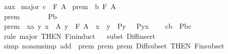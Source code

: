 \begin{isabellebody}
\isamarkupfalse%
%
\endisatagproof
{\isafoldproof}%
%
\isadelimproof
\isanewline
%
\endisadelimproof
\isanewline
{}\isamarkupfalse%
\ aux{\isacharcolon}\isanewline
{}\ major{\isacharcolon}\ {\isachardoublequoteopen}c\ {\isacharcolon}\ {\isacharpercent}F\ A{\isachardoublequoteclose}\isanewline
{}\ prem{}{\isacharcolon}\ \ {\isachardoublequoteopen}b{\isacharcolon}\ {\isacharpercent}F\ A{\isachardoublequoteclose}\ \ \ \ \ \ \ \ \ \ \ \ \ \ \ \ \ \ \ \ \ \ \ \ \ \ \ \ \ \ \ \ \ \ \ \isanewline
{}\ prem{}{\isacharcolon}\ {\isachardoublequoteopen}\ \ \ \ \ \ \ P{\isacharparenleft}b{\isacharparenright}{\isachardoublequoteclose}\ \ \ \ \ \ \ \ \ \ \ \ \ \ \ \ \ \ \ \ \ \ \ \ \ \ \ \ \ \ \ \ \ \ \ \ \ \ \ \ \ \ \ \ \isanewline
{}\ prem{}{\isacharcolon}\ {\isachardoublequoteopen}\ {\isacharbang}{\isacharbang}{\isacharparenleft}x{\isacharcolon}{\isacharcolon}{\isacharprime}a{\isacharparenright}\ y{\isachardot}\ {\isasymlbrakk}x\ {\isacharcolon}\ A{\isacharsemicolon}\ y\ {\isacharcolon}\ {\isacharpercent}F\ A{\isacharsemicolon}\ \ x\ {\isacharcolon}\ y{\isacharsemicolon}\ \ P{\isacharparenleft}y{\isacharparenright}\ {\isasymrbrakk}\ {\isasymLongrightarrow}\ P{\isacharparenleft}y{\isacharminus}{\isacharbraceleft}x{\isacharbraceright}{\isacharparenright}\ {\isachardoublequoteclose}\ \isanewline
{}\ {\isachardoublequoteopen}\ c{\isacharless}{\isacharequal}b\ {\isasymlongrightarrow}\ P{\isacharparenleft}b{\isacharminus}c{\isacharparenright}{\isachardoublequoteclose}\isanewline
%
\isadelimproof
%
\endisadelimproof
%
\isatagproof
{}\isamarkupfalse%
\ {\isacharparenleft}rule\ major\ {\isacharbrackleft}THEN\ Fin{\isacharunderscore}induct{\isacharbrackright}{\isacharparenright}\isanewline
{}\isamarkupfalse%
\ {}\isanewline
{}\isamarkupfalse%
\ {\isacharparenleft}subst\ Diff{\isacharunderscore}insert{\isacharparenright}\isanewline
{}\isamarkupfalse%
\ {}\isanewline
{}\isamarkupfalse%
\ {\isacharparenleft}simp\ {\isacharparenleft}no{\isacharunderscore}asm{\isacharunderscore}simp{\isacharparenright}\ add\ {\isacharcolon}\ prem{}\ prem{}\ prem{}\ Diff{\isacharunderscore}subset\ {\isacharbrackleft}THEN\ Fin{\isacharunderscore}subset{\isacharbrackright}{\isacharparenright}{\isacharplus}\isanewline
{}\isamarkupfalse%
%
\endisatagproof
{\isafoldproof}%
%
\isadelimproof
\ \isanewline

\end{isabellebody}

